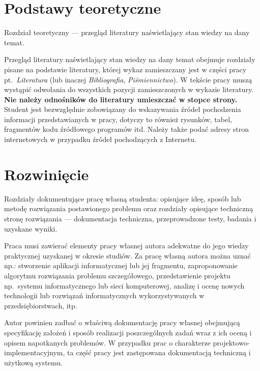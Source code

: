 \chapter{Podstawy teoretyczne}

Rozdział teoretyczny --- przegląd literatury naświetlający stan wiedzy na dany temat. 

Przegląd literatury naświetlający stan wiedzy na dany temat obejmuje rozdziały pisane na podstawie
literatury, której wykaz zamieszczany jest w części pracy pt.~\emph{Literatura} (lub inaczej \emph{Bibliografia},
\emph{Piśmiennictwo}). W tekście pracy muszą wystąpić odwołania do wszystkich pozycji zamieszczonych w
wykazie literatury. \textbf{Nie należy odnośników do literatury umieszczać w stopce strony.} Student jest
bezwzględnie zobowiązany do wskazywania źródeł pochodzenia informacji przedstawianych w pracy,
dotyczy to również rysunków, tabel, fragmentów kodu źródłowego programów itd. Należy także podać
adresy stron internetowych w przypadku źródeł pochodzących z Internetu.



\chapter{Rozwinięcie}

Rozdziały dokumentujące pracę własną studenta: opisujące ideę, sposób lub metodę 
rozwiązania postawionego problemu oraz rozdziały opisujące techniczną stronę rozwiązania 
--- dokumentacja techniczna, przeprowadzone testy, badania i uzyskane wyniki. 

Praca musi zawierać elementy pracy własnej autora adekwatne do jego wiedzy praktycznej uzyskanej w
okresie studiów. Za pracę własną autora można uznać np.: stworzenie aplikacji informatycznej lub jej
fragmentu, zaproponowanie algorytmu rozwiązania problemu szczegółowego, przedstawienie projektu 
np.~systemu informatycznego lub sieci komputerowej, analizę i ocenę nowych technologii lub rozwiązań
informatycznych wykorzystywanych w przedsiębiorstwach, itp. 

Autor powinien zadbać o właściwą dokumentację pracy własnej obejmującą specyfikację założeń i 
sposób realizacji poszczególnych zadań
wraz z ich oceną i opisem napotkanych problemów. W przypadku prac o charakterze 
projektowo-implementacyjnym, ta część pracy jest zastępowana dokumentacją techniczną i użytkową systemu. 


